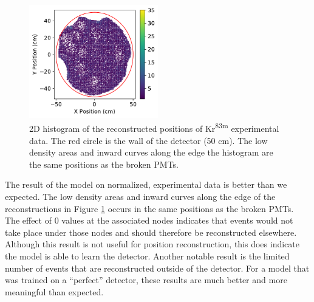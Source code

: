 \documentclass[../thesis.tex]{subfiles}
\begin{document}
\begin{figure}[t]
	\centering
	\includegraphics[width=0.5\textwidth]{figures/iso-kr83_reco_pos.pdf}
	\caption{
	2D histogram of the reconstructed positions of Kr\textsuperscript{83m} experimental data.
	The red circle is the wall of the detector (50 cm).
	The low density areas and inward curves along the edge the histogram are the same positions as the broken PMTs.
	}
	\label{fig:iso_2D-hist}
\end{figure}

\par The result of the model on normalized, experimental data is better than we expected.
The low density areas and inward curves along the edge of the reconstructions in Figure \ref{fig:iso_2D-hist} occurs in the same positions as the broken PMTs.
The effect of 0 values at the associated nodes indicates that events would not take place under those nodes and should therefore be reconstructed elsewhere.
Although this result is not useful for position reconstruction, this does indicate the model is able to learn the detector.
Another notable result is the limited number of events that are reconstructed outside of the detector.
For a model that was trained on a ``perfect'' detector, these results are much better and more meaningful than expected.
\end{document}
